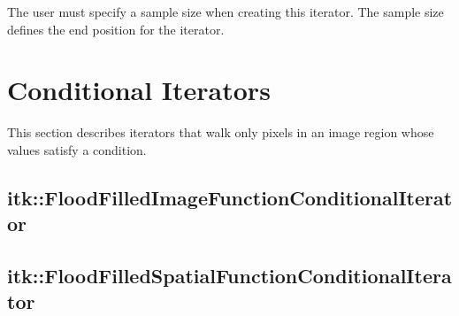 The user must specify a sample size when creating this iterator. The sample
size defines the end position for the iterator.  \Is








\section{Conditional Iterators}
\label{sec:ConditionalIterators}
This section describes iterators that walk only pixels in an image region whose
values satisfy a condition.





%

\subsection{itk::FloodFilledImageFunctionConditionalIterator}
\label{itk::FloodFilledImageFunctionConditionalIterator}


\subsection{itk::FloodFilledSpatialFunctionConditionalIterator}
\label{itk::FloodFilledSpatialFunctionConditionalIterator}


